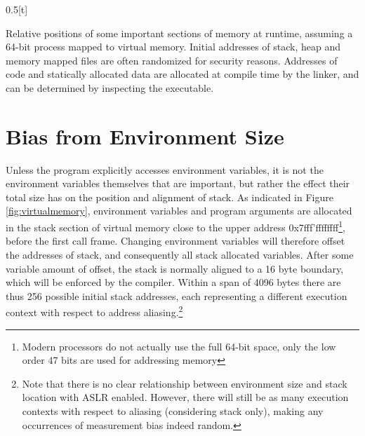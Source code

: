 \documentclass[prodmode,acmtaco]{acmsmall}
\begin{document}
\begin{narrowfig}{0.5\textwidth}[t]
  \centering
  \caption{Relative positions of some important sections of memory at runtime, assuming a 64-bit process mapped to virtual memory.
  Initial addresses of stack, heap and memory mapped files are often randomized for security reasons.
  Addresses of code and statically allocated data are allocated at compile time by the linker, and can be determined by inspecting the executable.}
  \label{fig:virtualmemory}
\end{narrowfig}


\section{Bias from Environment Size}
\label{sec:environment}
Unless the program explicitly accesses environment variables, it is not the environment variables themselves that are important, but rather the effect their total size has on the position and alignment of stack.
As indicated in Figure \ref{fig:virtualmemory}, environment variables and program arguments are allocated in the stack section of virtual memory close to the upper address 0x7fff'ffffffff\footnote{Modern processors do not actually use the full 64-bit space, only the low order 47 bits are used for addressing memory}, before the first call frame.
Changing environment variables will therefore offset the addresses of stack, and consequently all stack allocated variables.
After some variable amount of offset, the stack is normally aligned to a 16 byte boundary, which will be enforced by the compiler.
Within a span of 4096 bytes there are thus 256 possible initial stack addresses, each representing a different execution context with respect to address aliasing.\footnote{Note that there is no clear relationship between environment size and stack location with ASLR enabled.
However, there will still be as many execution contexts with respect to aliasing (considering stack only), making any occurrences of measurement bias indeed random.}
\end{document}
